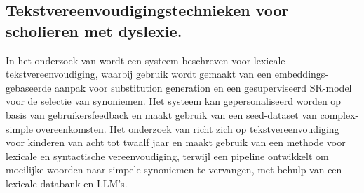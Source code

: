 \subsection{Tekstvereenvoudigingstechnieken voor scholieren met dyslexie.}

In het onderzoek van \textcite{Bingel2018} wordt een systeem beschreven voor lexicale tekstvereenvoudiging, waarbij gebruik wordt gemaakt van een embeddings-gebaseerde aanpak voor substitution generation en een gesuperviseerd SR-model voor de selectie van synoniemen. Het systeem kan gepersonaliseerd worden op basis van gebruikersfeedback en maakt gebruik van een seed-dataset van complex-simple overeenkomsten. Het onderzoek van \textcite{DeBelder2010} richt zich op tekstvereenvoudiging voor kinderen van acht tot twaalf jaar en maakt gebruik van een methode voor lexicale en syntactische vereenvoudiging, terwijl \textcite{Bulte2018} een pipeline ontwikkelt om moeilijke woorden naar simpele synoniemen te vervangen, met behulp van een lexicale databank en LLM's.


